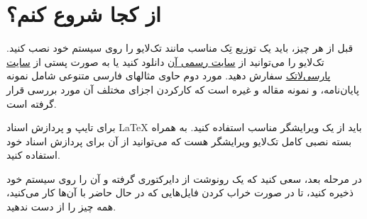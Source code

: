  \section{از کجا شروع کنم؟}
 قبل از هر چیز، باید یک توزیع تِک مناسب مانند تک‌لایو
 را روی سیستم خود نصب کنید. تک‌لایو  را می‌توانید از 
 \href{http://www.tug.org/texlive}{سایت رسمی آن}%
 دانلود کنید یا به صورت پستی از 
 \href{http://www.parsilatex.com}{سایت پارسی‌لاتک}%
 سفارش دهید. مورد دوم حاوی مثالهای فارسی متنوعی شامل نمونه پایان‌نامه، و نمونه مقاله و غیره است که کارکردن اجزای مختلف آن مورد بررسی قرار گرفته است.
 \par
 برای تایپ و پردازش اسناد
 \LaTeX
  باید از یک ویرایشگر مناسب استفاده کنید. به همراه بسته نصبی کامل تک‌لایو ویرایشگر 
 هست که می‌توانید از آن برای پردازش اسناد خود استفاده کنید. 
\par
 در مرحله بعد، سعی کنید که  یک رونوشت از دایرکتوری 
 گرفته و آن را روی سیستم خود ذخیره کنید، تا در صورت خراب کردن فایل‌هایی که در حال حاضر با آن‌ها کار می‌کنید، همه چیز را از دست ندهید.
 
